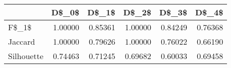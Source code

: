 \begin{table}
\centering
\caption{}
\label{}
\begin{tabular}{lrrrrr}
\toprule
{} &   D\$\_0\$ &   D\$\_1\$ &   D\$\_2\$ &   D\$\_3\$ &   D\$\_4\$ \\
\midrule
F\$\_1\$      & 1.00000 & 0.85361 & 1.00000 & 0.84249 & 0.76368 \\
Jaccard    & 1.00000 & 0.79626 & 1.00000 & 0.76022 & 0.66190 \\
Silhouette & 0.74463 & 0.71245 & 0.69682 & 0.60033 & 0.69458 \\
\bottomrule
\end{tabular}
\end{table}
